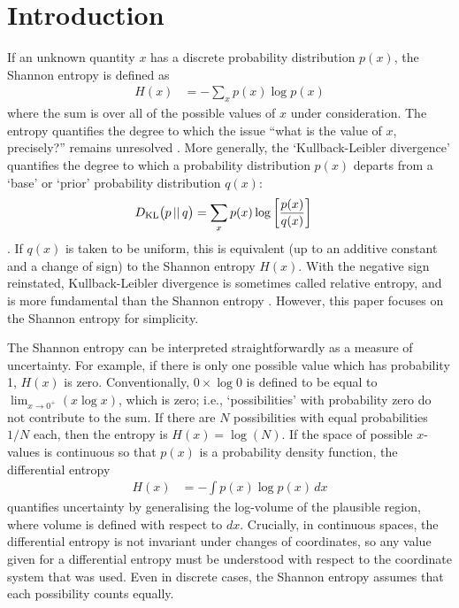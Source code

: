 \documentclass[entropy,article,accept,oneauthor,pdftex,10pt,a4paper]{mdpi}
\begin{document}

\section{Introduction}

If an unknown quantity $x$ has a discrete probability distribution $p(x)$,
the Shannon entropy \citep{shannon, cover2012elements} is defined as
\begin{align}
H(x) &= -\sum_{x} p(x) \log p(x)
\end{align}
where the sum is over all of the possible values of $x$ under consideration.
The entropy quantifies the degree to which the issue
``what is the value of $x$, precisely?'' remains unresolved
\citep{knuth_questions}. More generally, the `Kullback-Leibler divergence'
quantifies the degree to which a probability distribution $p(x)$ departs
from a `base' or `prior' probability distribution $q(x)$:
\begin{align}
D_{\rm KL}\big(p \,||\, q\big) &=
    \sum_{x} p(x) \log\left[\frac{p(x)}{q(x)}\right]
\end{align}
\citep{knuth2012foundations, caticha2006updating}.
If $q(x)$ is taken to be uniform, this is equivalent (up to an additive
constant and a change of sign) to the Shannon entropy $H(x)$.
With the negative sign reinstated, Kullback-Leibler divergence is sometimes
called relative entropy, and is more fundamental than the Shannon entropy
\citep{knuth2012foundations}. However, this paper focuses on the Shannon
entropy for simplicity.

The Shannon entropy can be interpreted straightforwardly as a measure of
uncertainty. For example,
if there is only one possible value which has probability 1, $H(x)$ is
zero. Conventionally, $0 \times \log 0$ is defined to be equal
to $\lim_{x \to 0^+} (x\log x)$, which is zero; i.e., `possibilities' with
probability zero do not contribute to the sum.
If there are $N$ possibilities with equal probabilities $1/N$ each,
then the entropy is $H(x) = \log(N)$.
If the space of possible $x$-values is continuous so that $p(x)$ is a
probability density function, the differential entropy
\begin{align}
H(x) &= -\int p(x) \log p(x) \, dx
\end{align}
quantifies uncertainty by generalising the log-volume
of the plausible region, where volume is defined with respect to $dx$.
Crucially, in continuous spaces, the differential entropy is not
invariant under changes of coordinates, so any value given for a
differential entropy must be understood with respect to the coordinate
system that was used. Even in discrete cases, the Shannon entropy assumes
that each possibility counts equally.
\end{document}
